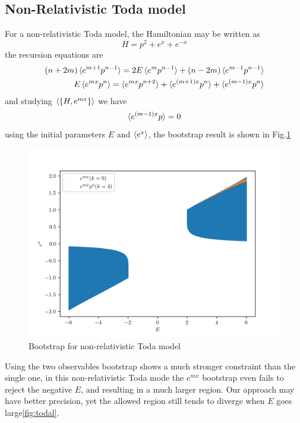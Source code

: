\documentclass[aps, preprint,amsmath, amssymb]{revtex4-2}
\begin{document}
\subsection{Non-Relativistic Toda model}
For a non-relativistic Toda model, the Hamiltonian may be written as
\begin{equation}
    H = p^2 + e^x + e^{-x}
\end{equation}
the recursion equations are 
\begin{align}
    (n + 2m)\braket{e^{m + 1} p^{n - 1}} = 2E\braket{e^m p^{n - 1}} + (n - 2m)\braket{e^{m - 1} p^{n - 1}}\notag \\ 
    E\braket{e^{mx} p^n} = \braket{e^{mx} p^{n + 2}} + \braket{e^{(m + 1)x} p^n} + \braket{e^{(m - 1)x} p^n}
\end{align}
and studying $\braket{\{H, e^{mx}\}}$ we have
\begin{equation}
    \braket{e^{(m - 1)x} p} = 0
\end{equation}
using the initial parameters $E$ and $\braket{e^x}$, the bootstrap result is shown in Fig.\ref{fig:toda}
\begin{figure}
    \includegraphics[width=0.8\linewidth]{toda_compare.png}
    \caption{Bootstrap for non-relativistic Toda model}
    \label{fig:toda}
\end{figure}

Using the two observables bootstrap shows a much stronger constraint than the single one, in this non-relativistic Toda mode the $e^{mx}$ bootstrap even fails to reject the negative $E$, and resulting in a much larger region. Our approach may have better precision, yet the allowed region still tends to diverge when $E$ goes large\ref{fig:todal}.
\end{document}
